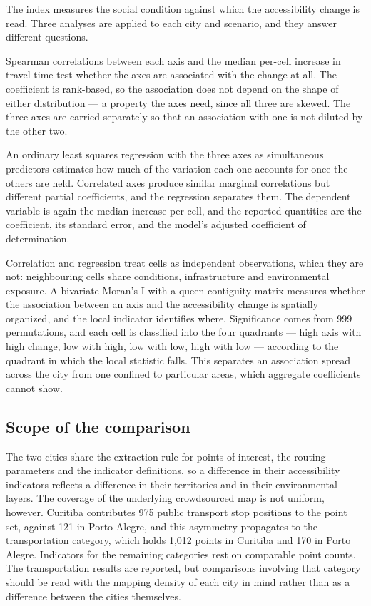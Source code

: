The index measures the social condition against which the accessibility change is read. Three analyses are applied to each city and scenario, and they answer different questions.

Spearman correlations between each axis and the median per-cell increase in travel time test whether the axes are associated with the change at all. The coefficient is rank-based, so the association does not depend on the shape of either distribution — a property the axes need, since all three are skewed. The three axes are carried separately so that an association with one is not diluted by the other two.

An ordinary least squares regression with the three axes as simultaneous predictors estimates how much of the variation each one accounts for once the others are held. Correlated axes produce similar marginal correlations but different partial coefficients, and the regression separates them. The dependent variable is again the median increase per cell, and the reported quantities are the coefficient, its standard error, and the model's adjusted coefficient of determination.

Correlation and regression treat cells as independent observations, which they are not: neighbouring cells share conditions, infrastructure and environmental exposure. A bivariate Moran's I with a queen contiguity matrix measures whether the association between an axis and the accessibility change is spatially organized, and the local indicator identifies where. Significance comes from 999 permutations, and each cell is classified into the four quadrants — high axis with high change, low with high, low with low, high with low — according to the quadrant in which the local statistic falls. This separates an association spread across the city from one confined to particular areas, which aggregate coefficients cannot show.

\subsection{Scope of the comparison}
\label{subsec:scope-comparison}

The two cities share the extraction rule for points of interest, the routing parameters and the indicator definitions, so a difference in their accessibility indicators reflects a difference in their territories and in their environmental layers. The coverage of the underlying crowdsourced map is not uniform, however. Curitiba contributes 975 public transport stop positions to the point set, against 121 in Porto Alegre, and this asymmetry propagates to the transportation category, which holds 1,012 points in Curitiba and 170 in Porto Alegre. Indicators for the remaining categories rest on comparable point counts. The transportation results are reported, but comparisons involving that category should be read with the mapping density of each city in mind rather than as a difference between the cities themselves.
